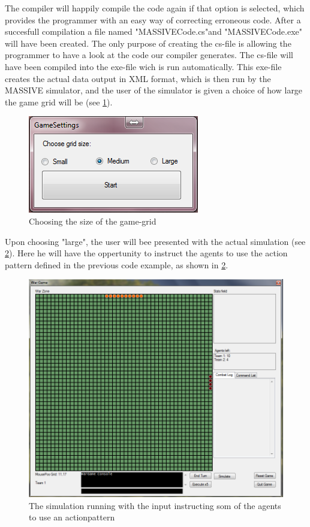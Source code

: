 The compiler will happily compile the code again if that option is selected, which provides the programmer with an easy way of correcting erroneous code. After a succesfull compilation a file named "MASSIVECode.cs"and "MASSIVECode.exe" will have been created. The only purpose of creating the cs-file is allowing the programmer to have a look at the code our compiler generates. The cs-file will have been compiled into the exe-file wich is run automatically. This exe-file creates the actual data output in XML format, which is then run by the MASSIVE simulator, and the user of the simulator is given a choice of how large the game grid will be (see \ref{fig:game_promt}).

\begin{figure}[h]%
\begin{center}
\includegraphics[scale=0.6]{Images/massive_dialog.png}%
\end{center}
\caption{Choosing the size of the game-grid}%
\label{fig:game_promt}%
\end{figure}

Upon choosing "large", the user will bee presented with the actual simulation (see \ref{fig:runninggame}). Here he will have the oppertunity to instruct the agents to use the action pattern defined in the previous code example, as shown in \ref{fig:runninggame}.

\begin{figure}%
\begin{center}
\includegraphics[scale=0.6]{Images/massive_small.png}%
\end{center}
\caption{The simulation running with the input instructing som of the agents to use an actionpattern}%
\label{fig:runninggame}%
\end{figure}

